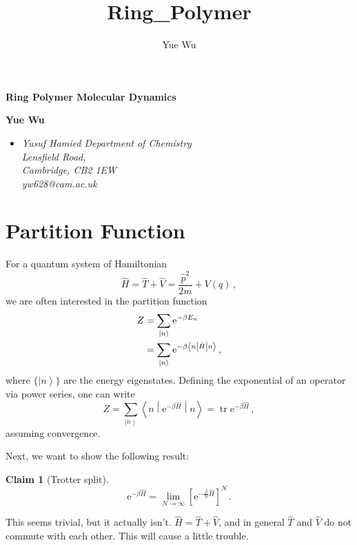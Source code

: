\documentclass{article}
\title{Ring_Polymer}
\author{Yue Wu}
\theoremstyle{plain}\theoremheaderfont{\normalfont\itshape}\theorembodyfont{\rmfamily}\theoremseparator{.}\newtheorem*{rem}{Remark}\newtheorem*{ex}{Example}\newtheorem*{proof}{Proof}\newtheorem*{altp}{Alternative proof}
\theoremstyle{plain}\theoremheaderfont{\normalfont\bfseries}\theorembodyfont{\rmfamily}\theoremseparator{.}\newtheorem{thm}{Theorem}[section]\newtheorem{lem}[thm]{Lemma}\newtheorem{prop}[thm]{Proposition}\newtheorem*{cor}{Corollary}\newtheorem{defn}[thm]{Definition}\newtheorem{clm}[thm]{Claim}\newtheorem{clminproof}{Claim}
\theoremstyle{break}\theoremheaderfont{\normalfont\itshape}\theorembodyfont{\rmfamily}\theoremseparator{.\medskip}\newtheorem*{proofskip}{Proof}\newtheorem*{exs}{Examples}\newtheorem*{rems}{Remarks}
\theoremstyle{break}\theoremheaderfont{\normalfont\bfseries}\theorembodyfont{\rmfamily}\theoremseparator{.\medskip}\newtheorem{lemskip}[thm]{Lemma}\newtheorem{defnskip}[thm]{Definition}\newtheorem{propskip}[thm]{Proposition}\newtheorem{thmskip}[thm]{Theorem}
\numberwithin{equation}{section}
\newcommand{\ee}{\mathrm{e}}
\newcommand{\ket}[1]{\left| #1 \right\rangle}
\newcommand{\mel}[3]{\left\langle #1 \middle| #2 \middle| #3 \right\rangle}
\newcommand{\expval}[2]{\left\langle #2 \middle| #1 \middle| #2 \right\rangle}
\DeclareMathOperator{\tr}{tr}
\begin{document}
    \setlength{\parindent}{0pt}
	\Huge\textsf{\textbf{Ring Polymer Molecular Dynamics}}

	\noindent\makebox[\linewidth]{\rule{\textwidth}{2pt}}

	\large\textsf{\textbf{Yue Wu}}
	\begin{itemize}[topsep=0pt,leftmargin=15pt]
		\item[] \textit{Yusuf Hamied Department of Chemistry\\
		Lensfield Road,\\
		Cambridge, CB2 1EW}\\

		\textit{yw628@cam.ac.uk}
	\end{itemize}
    \thispagestyle{empty}
    \setlength{\parindent}{15pt}

    \normalsize
	\newpage
	\tableofcontents
	\newpage

    \section{Partition Function}
    For a quantum system of Hamiltonian
    \begin{equation}
        \hat{H}=\hat{T}+\hat{V}=\frac{\hat{p}^2}{2m}+V(q)\,,
    \end{equation}    
    we are often interested in the partition function
    \begin{align}
        Z&=\sum_{\ket{n}}\ee^{-\beta E_n}\notag \\
        &=\sum_{\ket{n}} \ee^{-\beta\mel{n}{\hat{H}}{n}}\,,
    \end{align}
    where \(\{\ket{n}\}\) are the energy eigenstates. Defining the exponential of an operator via power series, one can write
    \begin{equation}
        Z=\sum_{\ket{n}}\expval{\ee^{-\beta\hat{H}}}{n}=\tr\ee^{-\beta\hat{H}}\,,
    \end{equation}
    assuming convergence.

    Next, we want to show the following result:
    \begin{clm}[Trotter split]
        \begin{equation}
            \ee^{-\beta\hat{H}}=\lim_{N\to\infty}\left[\ee^{-\frac{\beta}{N}\hat{H}}\right]^N\,.
        \end{equation}
    \end{clm}
    This seems trivial, but it actually isn't. \(\hat{H}=\hat{T}+\hat{V}\), and in general \(\hat{T}\) and \(\hat{V}\) do not commute with each other. This will cause a little trouble.
    
\end{document}
